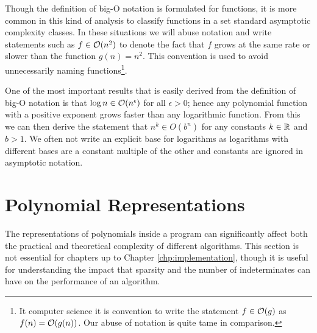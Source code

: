 Though the definition of big-O notation is formulated for functions, it is more common in this kind of analysis to classify functions in a set standard asymptotic complexity classes. In these situations we will abuse notation and write statements such as $f \in \mathcal O(n^2)$ to denote the fact that $f$ grows at the same rate or slower than the function $g(n) = n^2$. This convention is used to avoid unnecessarily naming functions\footnote{It computer science it is convention to write the statement $f \in \mathcal O(g)$ as $f(n) = \mathcal O(g(n))$. Our abuse of notation is quite tame in comparison.}.

One of the most important results that is easily derived from the definition of big-O notation is that $\log n \in \mathcal O(n^\epsilon)$ for all $\epsilon > 0$; hence any polynomial function with a positive exponent grows faster than any logarithmic function. From this we can then derive the statement that $n^k \in O(b^n)$ for any constants $k \in {\mathbb R}$ and $b > 1$. We often not write an explicit base for logarithms as logarithms with different bases are a constant multiple of the other and constants are ignored in asymptotic notation.

\section{Polynomial Representations}

The representations of polynomials inside a program can significantly affect both the practical and theoretical complexity of different algorithms. This section is not essential for chapters up to Chapter \ref{chp:implementation}, though it is useful for understanding the impact that sparsity and the number of indeterminates can have on the performance of an algorithm.

